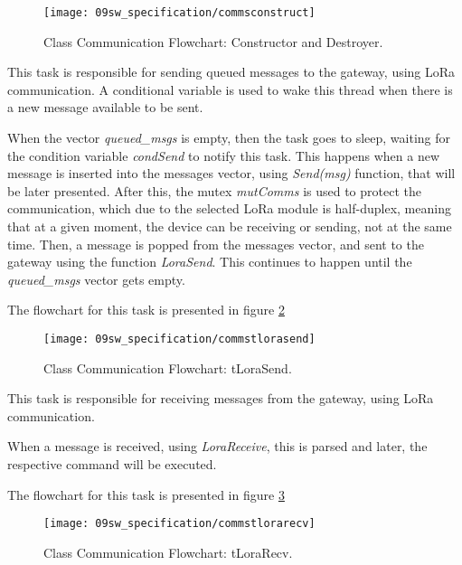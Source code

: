 \begin{figure}[H]
	\centering			\texttt{[image: 09sw\_specification/commsconstruct]}
	\caption{Class Communication Flowchart: Constructor and Destroyer.}
	\label{fig:flow_commconstruct}
\end{figure}


This task is responsible for sending queued messages to the gateway, using LoRa communication. A conditional variable is used to wake this thread when there is a new message available to be sent.

When the vector \textit{queued\_msgs} is empty, then the task goes to sleep, waiting for the condition variable \textit{condSend} to notify this task. This happens when a new message is inserted into the messages vector, using \textit{Send(msg)} function, that will be later presented. After this, the mutex \textit{mutComms} is used to protect the communication, which due to the selected LoRa module is half-duplex, meaning that at a given moment, the device can be receiving or sending, not at the same time. Then, a message is popped from the messages vector, and sent to the gateway using the function \textit{LoraSend}. This continues to happen until the \textit{queued\_msgs} vector gets empty.

The flowchart for this task is presented in figure \ref{fig:flow_tlorasend}

\begin{figure}[H]
	\centering		\texttt{[image: 09sw\_specification/commstlorasend]}
	\caption{Class Communication Flowchart: tLoraSend.}
	\label{fig:flow_tlorasend}
\end{figure}



This task is responsible for receiving messages from the gateway, using LoRa communication.

When a message is received, using \textit{LoraReceive}, this is parsed and later, the respective command will be executed.

The flowchart for this task is presented in figure \ref{fig:flow_tlorarecv}

\begin{figure}[H]
	\centering		\texttt{[image: 09sw\_specification/commstlorarecv]}
	\caption{Class Communication Flowchart: tLoraRecv.}
	\label{fig:flow_tlorarecv}
\end{figure}

